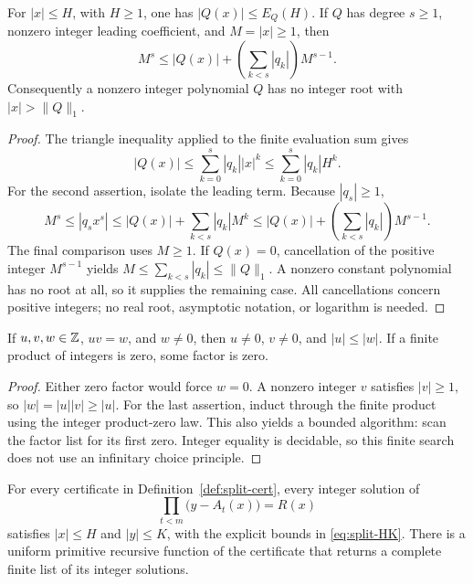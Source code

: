\begin{lemma}
\label{lem:split-poly-estimates}
For \(|x|\leq H\), with \(H\geq1\), one has
\( |Q(x)|\leq E_Q(H)\).
If \(Q\) has degree \(s\geq1\), nonzero integer leading coefficient,
and \(M=|x|\geq1\), then
\begin{equation}
 M^s\leq |Q(x)|+
          \left(\sum_{k<s}|q_k|\right)M^{s-1}.
 \label{eq:split-dominance}
\end{equation}
Consequently a nonzero integer polynomial \(Q\) has no integer root
with \(|x|>\|Q\|_1\).
\end{lemma}

\begin{proof}
The triangle inequality applied to the finite evaluation sum gives
\[
 |Q(x)|\leq\sum_{k=0}^s|q_k||x|^k
              \leq\sum_{k=0}^s|q_k|H^k.
\]
For the second assertion, isolate the leading term.  Because
\(|q_s|\geq1\),
\[
 M^s\leq |q_sx^s|
 \leq |Q(x)|+\sum_{k<s}|q_k|M^k
 \leq |Q(x)|+
          \left(\sum_{k<s}|q_k|\right)M^{s-1}.
\]
The final comparison uses \(M\geq1\).
If \(Q(x)=0\), cancellation of the positive integer \(M^{s-1}\)
yields \(M\leq\sum_{k<s}|q_k|\leq\|Q\|_1\).
A nonzero constant polynomial has no root at all, so it supplies the
remaining case.  All cancellations concern positive integers; no real
root, asymptotic notation, or logarithm is needed.
\end{proof}

\begin{lemma}
\label{lem:split-factor}
If \(u,v,w\in\mathbb Z\), \(uv=w\), and \(w\ne0\), then
\(u\ne0\), \(v\ne0\), and \(|u|\leq|w|\).
If a finite product of integers is zero, some factor is zero.
\end{lemma}

\begin{proof}
Either zero factor would force \(w=0\).  A nonzero integer \(v\)
satisfies \(|v|\geq1\), so
\(|w|=|u||v|\geq|u|\).  For the last assertion, induct through the
finite product using the integer product-zero law.  This also yields a
bounded algorithm: scan the factor list for its first zero.  Integer
equality is decidable, so this finite search does not use an infinitary
choice principle.
\end{proof}

\begin{theorem}
\label{thm:split-bound}
For every certificate in Definition~\ref{def:split-cert}, every integer
solution of
\begin{equation}
 \prod_{t<m}\bigl(y-A_t(x)\bigr)=R(x)
 \label{eq:split-equation}
\end{equation}
satisfies \(|x|\leq H\) and \(|y|\leq K\), with the explicit
bounds in \eqref{eq:split-HK}.
There is a uniform primitive recursive function of the certificate
that returns a complete finite list of its integer solutions.
\end{theorem}

